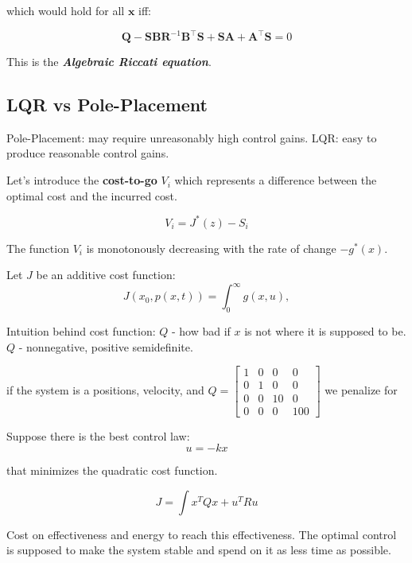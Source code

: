 which would hold for all $\mathbf{x}$ iff:

\begin{equation}
    \mathbf{Q} - \mathbf{S} \mathbf{B} \mathbf{R}^{-1} \mathbf{B}^\top \mathbf{S} 
     + \mathbf{S} \mathbf{A} + \mathbf{A}^\top \mathbf{S} = 0
\end{equation}

This is the \emph{\textbf{Algebraic Riccati equation}}.


\subsection{LQR vs Pole-Placement}


Pole-Placement: may require unreasonably high control gains. 
LQR: easy to produce reasonable control gains. 







Let's introduce the \textbf{cost-to-go} $V_i$ which represents a difference between the optimal cost and the incurred cost. 

\[V_i = J^*(z) - S_i\]

The function $V_i$ is monotonously decreasing with the rate  of change $-g^*(x)$. 

Let \(J\) be an additive cost function:
\[J(x_0, p(x, t)) = \int_{0}^{\infty} g(x, u), \]

Intuition behind cost function: \(Q\) - how bad if \(x\) is not where it is supposed to be.
\(Q\) - nonnegative, positive semidefinite.

if the system is a positions, velocity, and \(Q = \begin{bmatrix} 1 & 0 & 0 & 0 \\ 0 & 1 & 0 & 0 \\ 0 & 0 & 10 & 0 \\ 0 & 0 & 0 & 100 \end{bmatrix}\) we penalize for 

Suppose there is the best control law:
\[u = -kx\]

that minimizes the quadratic cost function.

\[J = \int x^T Q x + u^T R u\]

Cost on effectiveness and energy to reach this effectiveness.
The optimal control is supposed to make the system stable and spend on it as less time as possible. 

